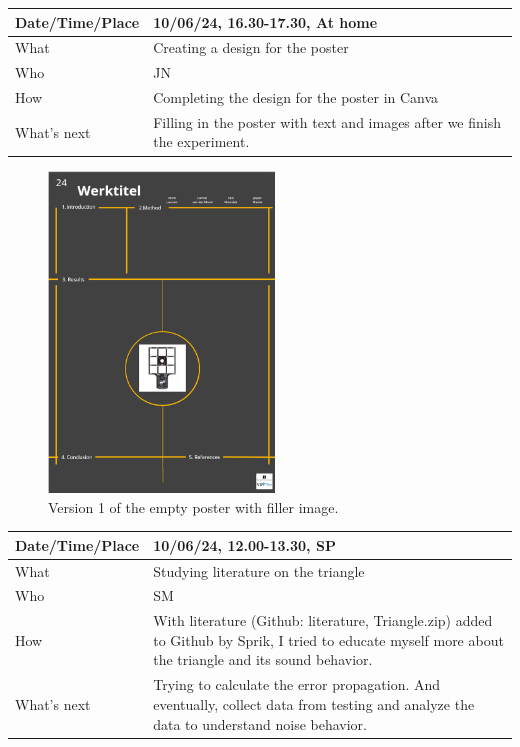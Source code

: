 \documentclass{article}
\begin{document}
\begin{table}[H]
\begin{tabular}{|p{1.5in}|p{4in}|}
\hline
Date/Time/Place & 10/06/24, 16.30-17.30, At home \\ \hline
What            &  Creating a design for the poster\\ \hline
Who             &  JN \\ \hline
How             &  Completing the design for the poster in Canva\\ \hline
What's next     &  Filling in the poster with text and images after we finish the experiment.\\ \hline
\end{tabular}
\end{table}

\begin{figure}[H]
    \centering
    \includegraphics[width=6cm]{PosterV1.png}
    \caption{Version 1 of the empty poster with filler image.}   
\end{figure}

\begin{table}[H]
\begin{tabular}{|p{1.5in}|p{4in}|}
\hline
Date/Time/Place &  10/06/24, 12.00-13.30, SP\\ \hline
What            &  Studying literature on the triangle \\ \hline
Who             &  SM\\ \hline
How             &  With literature (Github: literature, Triangle.zip) added to Github by Sprik, I tried to educate myself more about the triangle and its sound behavior.\\ \hline
What's next     &   Trying to calculate the error propagation. And eventually, collect data from testing and analyze the data to understand noise behavior.\\ \hline
\end{tabular}
\end{table}
\end{document}
